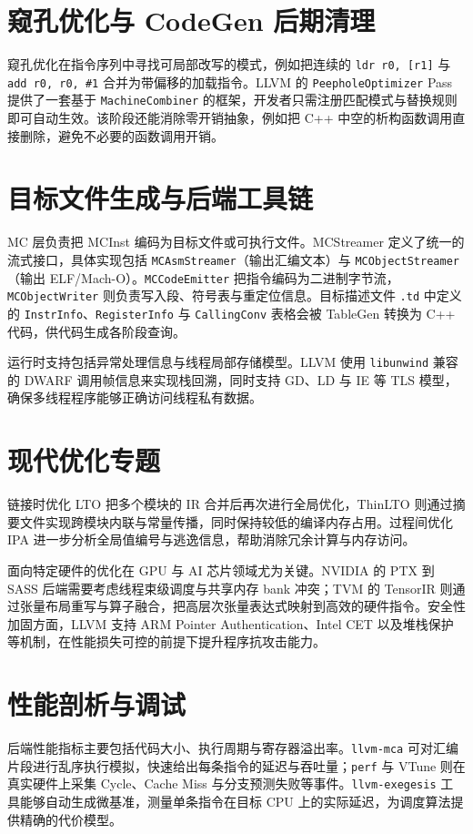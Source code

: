 \chapter{窥孔优化与 CodeGen 后期清理}
窥孔优化在指令序列中寻找可局部改写的模式，例如把连续的 \texttt{ldr r0, [r1]} 与 \texttt{add r0, r0, \#{}1} 合并为带偏移的加载指令。LLVM 的 \texttt{PeepholeOptimizer} Pass 提供了一套基于 \texttt{MachineCombiner} 的框架，开发者只需注册匹配模式与替换规则即可自动生效。该阶段还能消除零开销抽象，例如把 C++ 中空的析构函数调用直接删除，避免不必要的函数调用开销。\par
\chapter{目标文件生成与后端工具链}
MC 层负责把 MCInst 编码为目标文件或可执行文件。MCStreamer 定义了统一的流式接口，具体实现包括 \texttt{MCAsmStreamer}（输出汇编文本）与 \texttt{MCObjectStreamer}（输出 ELF/Mach-O）。\texttt{MCCodeEmitter} 把指令编码为二进制字节流，\texttt{MCObjectWriter} 则负责写入段、符号表与重定位信息。目标描述文件 \texttt{.td} 中定义的 \texttt{InstrInfo}、\texttt{RegisterInfo} 与 \texttt{CallingConv} 表格会被 TableGen 转换为 C++ 代码，供代码生成各阶段查询。\par
运行时支持包括异常处理信息与线程局部存储模型。LLVM 使用 \texttt{libunwind} 兼容的 DWARF 调用帧信息来实现栈回溯，同时支持 GD、LD 与 IE 等 TLS 模型，确保多线程程序能够正确访问线程私有数据。\par
\chapter{现代优化专题}
链接时优化 LTO 把多个模块的 IR 合并后再次进行全局优化，ThinLTO 则通过摘要文件实现跨模块内联与常量传播，同时保持较低的编译内存占用。过程间优化 IPA 进一步分析全局值编号与逃逸信息，帮助消除冗余计算与内存访问。\par
面向特定硬件的优化在 GPU 与 AI 芯片领域尤为关键。NVIDIA 的 PTX 到 SASS 后端需要考虑线程束级调度与共享内存 bank 冲突；TVM 的 TensorIR 则通过张量布局重写与算子融合，把高层次张量表达式映射到高效的硬件指令。安全性加固方面，LLVM 支持 ARM Pointer Authentication、Intel CET 以及堆栈保护等机制，在性能损失可控的前提下提升程序抗攻击能力。\par
\chapter{性能剖析与调试}
后端性能指标主要包括代码大小、执行周期与寄存器溢出率。\texttt{llvm-mca} 可对汇编片段进行乱序执行模拟，快速给出每条指令的延迟与吞吐量；\texttt{perf} 与 VTune 则在真实硬件上采集 Cycle、Cache Miss 与分支预测失败等事件。\texttt{llvm-exegesis} 工具能够自动生成微基准，测量单条指令在目标 CPU 上的实际延迟，为调度算法提供精确的代价模型。\par
